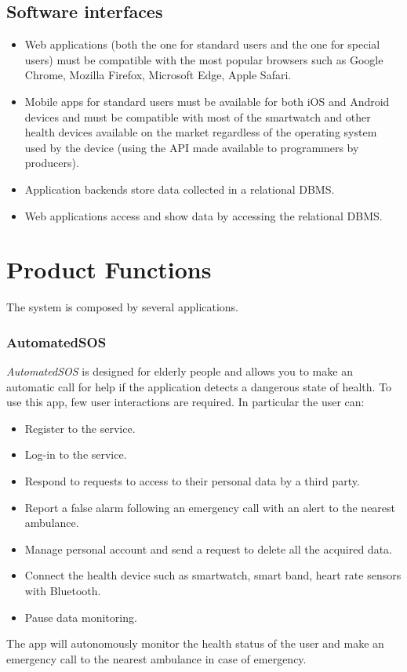 \subsection{Software interfaces}
\begin{itemize}
\item Web applications (both the one for standard users and the one for special users) must be compatible with the most popular browsers such as Google Chrome, Mozilla Firefox, Microsoft Edge, Apple Safari.
\item	Mobile apps for standard users must be available for both iOS and Android devices and must be compatible with most of the smartwatch and other health devices available on the market regardless of the operating system used by the device (using the API made available to programmers by producers).
\item	Application backends store data collected in a relational DBMS.
\item	 Web applications access and show data by accessing the relational DBMS.
\end{itemize}

\section{Product Functions}
The system is composed by several applications.
\subsubsection{AutomatedSOS}
\textit{AutomatedSOS} is designed for elderly people and allows you to make an automatic call for help if the application detects a dangerous state of health.
To use this app, few user interactions are required.
In particular the user can:
\begin{itemize}
\item Register to the service.
\item Log-in to the service.
\item Respond to requests to access to their personal data by a third party.
\item Report a false alarm following an emergency call with an alert to the nearest ambulance.
\item Manage personal account and send a request to delete all the acquired data.
\item Connect the health device such as smartwatch, smart band, heart rate sensors with Bluetooth.
\item Pause data monitoring.
\end{itemize}
The app will autonomously monitor the health status of the user and make an emergency call to the nearest ambulance in case of emergency.

